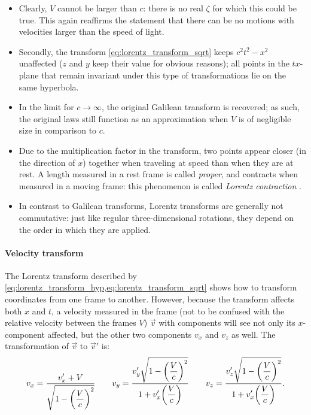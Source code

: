 \begin{itemize}
    \item Clearly, \(V\) cannot be larger than \(c\): there is no real \(\zeta\) for which this could be true. This again reaffirms the statement that there can be no motions with velocities larger than the speed of light.
    \item Secondly, the transform \cref{eq:lorentz_transform_sqrt} keeps \(c^2t^2 - x^2\) unaffected (\(z\) and \(y\) keep their value for obvious reasons); all points in the \(tx\)-plane that remain invariant under this type of transformations lie on the same hyperbola. %
    \item In the limit for \(c \to \infty\), the original Galilean transform is recovered; as such, the original laws still function as an approximation when \(V\) is of negligible size in comparison to \(c\).
    \item Due to the multiplication factor in the transform, two points appear closer (in the direction of $x$) together when traveling at speed than when they are at rest. A length measured in a rest frame is called \emph{proper}, and contracts when measured in a moving frame: this phenomenon is called \emph{Lorentz contraction}   \cite{Landau1971}.
    \item In contrast to Galilean transforms, Lorentz transforms are generally not commutative: just like regular three-dimensional rotations, they depend on the order in which they are applied.
\end{itemize}
\paragraph{Velocity transform} The Lorentz transform described by \cref{eq:lorentz_transform_hyp,eq:lorentz_transform_sqrt} shows how to transform coordinates from one frame to another. However, because the transform affects both \(x\) and \(t\), a velocity measured in the frame (not to be confused with the relative velocity between the frames \(V\)) \(\vec{v}\) with components will see not only its \(x\)-component affected, but the other two components \(v_x\) and \(v_z\) as well. The transformation of \(\vec{v}\) to \(\vec{v}'\) is: \cite{Landau1971}
\begin{equation}
    v_x = \frac{\displaystyle v_x' + V}{\displaystyle \sqrt{1 - \qty(\frac{V}{c})^2}}\qquad 
    v_y = \frac{\displaystyle v_y'\sqrt{1 - \qty(\frac{V}{c})^2}}{\displaystyle 1 + v_x'
    \qty(\frac{V}{c})}\qquad
    v_z = \frac{\displaystyle v_z'\sqrt{1 - \qty(\frac{V}{c})^2}}{\displaystyle 1 + v_x'\qty(\frac{V}{c})}.
    \label{eq:lorentz_transform_vel}
\end{equation}

